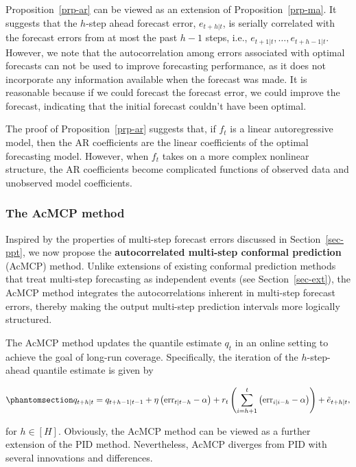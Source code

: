 \documentclass[
  11pt,
  a4paper,
]{article}
\theoremstyle{plain}
\theoremstyle{plain}
\theoremstyle{remark}
\begin{document}
Proposition~\ref{prp-ar} can be viewed as an extension of
Proposition~\ref{prp-ma}. It suggests that the \(h\)-step ahead forecast
error, \(e_{t+h|t}\), is serially correlated with the forecast errors
from at most the past \(h-1\) steps, i.e.,
\(e_{t+1|t}, \ldots, e_{t+h-1|t}\). However, we note that the
autocorrelation among errors associated with optimal forecasts can not
be used to improve forecasting performance, as it does not incorporate
any information available when the forecast was made. It is reasonable
because if we could forecast the forecast error, we could improve the
forecast, indicating that the initial forecast couldn't have been
optimal.

The proof of Proposition~\ref{prp-ar} suggests that, if \(f_t\) is a
linear autoregressive model, then the AR coefficients are the linear
coefficients of the optimal forecasting model. However, when \(f_t\)
takes on a more complex nonlinear structure, the AR coefficients become
complicated functions of observed data and unobserved model
coefficients.

\subsubsection{The AcMCP method}\label{sec-novel}

Inspired by the properties of multi-step forecast errors discussed in
Section~\ref{sec-ppt}, we now propose the \textbf{autocorrelated
multi-step conformal prediction} (AcMCP) method. Unlike extensions of
existing conformal prediction methods that treat multi-step forecasting
as independent events (see Section~\ref{sec-ext}), the AcMCP method
integrates the autocorrelations inherent in multi-step forecast errors,
thereby making the output multi-step prediction intervals more logically
structured.

The AcMCP method updates the quantile estimate \(q_t\) in an online
setting to achieve the goal of long-run coverage. Specifically, the
iteration of the \(h\)-step-ahead quantile estimate is given by

\begin{equation}\phantomsection\label{eq-acmcp}{
q_{t+h|t}=q_{t+h-1|t-1}+\eta \left(\mathrm{err}_{t|t-h}-\alpha\right)+r_t\left(\sum_{i=h+1}^t \left(\mathrm{err}_{i|i-h}-\alpha\right)\right)+\tilde{e}_{t+h|t},
}\end{equation}

for \(h\in[H]\). Obviously, the AcMCP method can be viewed as a further
extension of the PID method. Nevertheless, AcMCP diverges from PID with
several innovations and differences.
\end{document}
